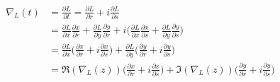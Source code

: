 \begin{equation}\label{chainchainchain}
\begin{aligned}
\nabla_{L}(t) &= \frac{\partial L}{\partial t} = \frac{\partial L}{\partial r} + i\frac{\partial L}{\partial s}\\
&= \frac{\partial L}{\partial x}\frac{\partial x}{\partial r} + \frac{\partial L}{\partial y}\frac{\partial y}{\partial r}+i\bigg(\frac{\partial L}{\partial x}\frac{\partial x}{\partial s}+\frac{\partial L}{\partial y}\frac{\partial y}{\partial s}\bigg)\\
&= \frac{\partial L}{\partial x}\bigg(\frac{\partial x}{\partial r}+i\frac{\partial x}{\partial s}\bigg)+\frac{\partial L}{\partial y}\bigg(\frac{\partial y}{\partial r}+i\frac{\partial y}{\partial s}\bigg)\\
&= \Re(\nabla_{L}(z))\bigg(\frac{\partial x}{\partial r}+i\frac{\partial x}{\partial s}\bigg)+\Im(\nabla_{L}(z))\bigg(\frac{\partial y}{\partial r}+i\frac{\partial y}{\partial s}\bigg)
\end{aligned}
\end{equation}






